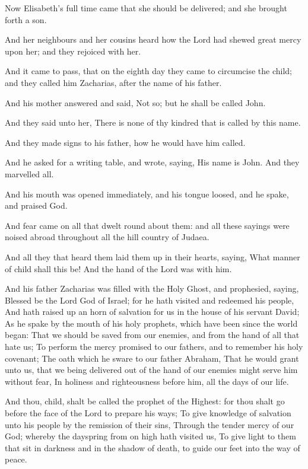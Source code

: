 \Verse Now Elisabeth's full time came that she should be delivered; and she brought forth a son.

\Verse And her neighbours and her cousins heard how the Lord had shewed great mercy upon her; and they rejoiced with her.

\Verse And it came to pass, that on the eighth day they came to circumcise the child; and they called him Zacharias, after the name of his father.

\Verse And his mother answered and said, Not so; but he shall be called John.

\Verse And they said unto her, There is none of thy kindred that is called by this name.

\Verse And they made signs to his father, how he would have him called.

\Verse And he asked for a writing table, and wrote, saying, His name is John. And they marvelled all.

\Verse And his mouth was opened immediately, and his tongue loosed, and he spake, and praised God.

\Verse And fear came on all that dwelt round about them: and all these sayings were noised abroad throughout all the hill country of Judaea.

\Verse And all they that heard them laid them up in their hearts, saying, What manner of child shall this be! And the hand of the Lord was with him.

\Verse And his father Zacharias was filled with the Holy Ghost, and prophesied, saying, \Verse Blessed be the Lord God of Israel; for he hath visited and redeemed his people, \Verse And hath raised up an horn of salvation for us in the house of his servant David; \Verse As he spake by the mouth of his holy prophets, which have been since the world began: \Verse That we should be saved from our enemies, and from the hand of all that hate us; \Verse To perform the mercy promised to our fathers, and to remember his holy covenant; \Verse The oath which he sware to our father Abraham, \Verse That he would grant unto us, that we being delivered out of the hand of our enemies might serve him without fear, \Verse In holiness and righteousness before him, all the days of our life.

\Verse And thou, child, shalt be called the prophet of the Highest: for thou shalt go before the face of the Lord to prepare his ways; \Verse To give knowledge of salvation unto his people by the remission of their sins, \Verse Through the tender mercy of our God; whereby the dayspring from on high hath visited us, \Verse To give light to them that sit in darkness and in the shadow of death, to guide our feet into the way of peace.

